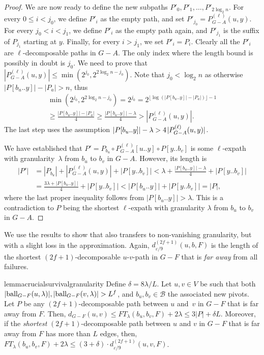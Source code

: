 \documentclass{article}\usepackage[a4paper,margin=20mm]{geometry}
\newcommand*{\B}{\mathcal{B}}
\newcommand*{\length}[1]{|#1|}
\newcommand*{\ball}{\mbox{\rm ball}}
\newcommand*{\nwspace}{\hspace*{.1em}}
\renewcommand{\geq}{\geqslant}
\renewcommand{\le}{\leqslant}
\newcommand{\eps}{\varepsilon}
\begin{document}
\begin{proof}
We are now ready to define the new subpaths $P'_0, P'_1, \ldots, P'_{2\log_2 n}$.
For every $0 \le i <j_0$, we define $P'_i$ as the empty path,
and set $P'_{j_0} = P^{(\ell)}_{G-A}(u,y)$. 
For every $j_0 < i < j_1$, we define $P'_i$ as the empty path again,
and $P'_{j_1}$ is the suffix of $P_{j_1}$ starting at $y$.
Finally, for every $i > j_1$, we set $P'_i = P_i$.
Clearly all the $P'_i$ are $\ell$-decomposable paths in $G - A$.
The only index where the length bound is possibly in doubt is $j_0$.
%
We need to prove that $\length{P^{(\ell)}_{G-A}(u,y)} \le \min(2^{j_0},2^{2\log_2 n - {j_0}})$.
Note that $j_0 < \log_2 n$ as otherwise $\length{P[b_u..y]}-\length{P_a} > n$,
thus
\begin{multline*}
	\min(2^{j_0},2^{2\log_2 n - {j_0}}) = 2^{j_0}
 	 = 2^{\lfloor\log(\length{P[b_u..y]}-\length{P_a})\rfloor -1}\\
 	\geq \frac{\length{P[b_u..y]} - \length{P_a}}{4} 
 	 \geq \frac{\length{P[b_u..y]} - \lambda}{4}
 	> \length{P^{(\ell)}_{G-A}(u,y)}.
\end{multline*}
The last step uses the assumption
$\length{P[b_u..y]}-\lambda > 4 \nwspace \length{P^{(\ell)}_{G-A}(u,y)}$.

We have established that $P'=P_{b_u} \circ P^{(\ell)}_{G-A}[u..y]\circ P[y..b_v]$
is some $\ell$-expath with granularity~$\lambda$ from $b_u$ to $b_v$ in $G-A$.
However, its length is
\begin{align*}
	\length{P'} &=\length{P_{b_u}} + \length{P^{(\ell)}_{G-A}(u,y)} + \length{P[y..b_v]}
		< \lambda + \frac{\length{P[b_u..y]}-\lambda}{4} + \length{P[y..b_v]}\\
		&= \frac{3\lambda + \length{P[b_u..y]}}{4} + \length{P[y..b_v]}
		< \length{P[b_u..y]}+\length{P[y..b_v]}=\length{P},
\end{align*}
where the last proper inequality follows from $|P[b_u..y]| > \lambda$.
This is a contradiction to $P$ being the shortest 
$\ell$-expath with granularity $\lambda$ from $b_u$ to $b_v$ in $G-A$.
\end{proof}

We use the results to show that also 
transfers to non-vanishing granularity, but with a slight loss in the approximation.
Again, $d^{(2f+1)}_{\eps/9}(u,b,F)$ is the length of the shortest $(2f{+}1)$-de\-com\-pos\-able
$u$-$v$-path in $G-F$ that is \emph{far away} from all failures.

\begin{restatable}{lemma}{crucialsurvivalgranularity}
\label{lem:crucial_survival_granularity}
  Define $\delta = 8\lambda/L$.
  Let $u,v \in V$ be such that both
  $|\ball_{G-F}(u,\lambda)|, |\ball_{G-F}(v,\lambda)| > L^f$,
  and  $b_u,b_v \in \B$ the associated new pivots.
  Let $P$ be any $(2f{+}1)$-de\-com\-pos\-able path between $u$ and~$v$ in $G-F$
  that is far away from $F$.
  Then,
  $d_{G-F}(u,v) \le FT_{\lambda}(b_u,b_v,F) + 2\lambda \le 3 \length{P} + \delta L$.
  Moreover, if the \emph{shortest} $(2f{+}1)$-de\-com\-pos\-able path between $u$ and $v$ in $G-F$ 
  that is far away from $F$ has more than $L$ edges,
  then,
  $FT_{\lambda}(b_u,b_v,F) + 2\lambda \le (3+\delta) \cdot d^{(2f+1)}_{\eps/9}(u,v,F)$.
\end{restatable}
\end{document}
